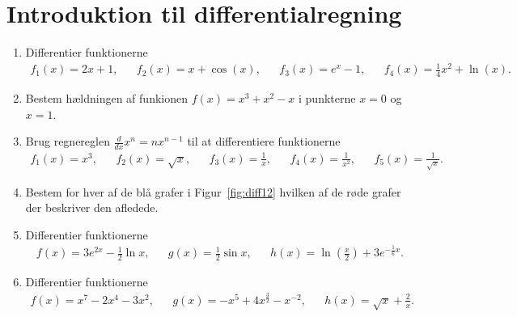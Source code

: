 \section{Introduktion til differentialregning}
\begin{enumerate}
	\item Differentier funktionerne 
	\begin{align*}
	f_1(x)=2x+1,&& f_2(x)=x+\cos(x),&& f_3(x)=e^x-1,&&f_4(x)=\frac{1}{4}x^2+\ln(x).
	\end{align*}
	
	
	\item Bestem hældningen af funkionen $f(x)=x^3+x^2-x$ i punkterne $x=0$ og $x=1$.

	\item Brug regnereglen $\frac{d}{dx} x^n=nx^{n-1}$ til at differentiere funktionerne
	\begin{align*}
	f_1(x)=x^3,&& f_2(x)=\sqrt{x},&& f_3(x)=\frac{1}{x},&&f_4(x)=\frac{1}{x^2},&&f_5(x)=\frac{1}{\sqrt{x}}.
	\end{align*}
	\item \label{it:diff12} Bestem for hver af de blå grafer i Figur~\ref{fig:diff12} hvilken af de røde grafer der beskriver den afledede.
	
	\item Differentier funktionerne 
	\begin{align*}
	f(x)=3e^{2x}-\frac{1}{2}\ln x,&& g(x)=\frac{1}{2}\sin x,&& h(x)=\ln(\frac{x}{2})+3e^{-\frac{1}{6}x}.
	\end{align*}
	
	\item Differentier funktionerne
	\begin{align*}
	f(x)=x^7-2x^4-3x^2,&&g(x)=-x^5+4x^{\frac{3}{2}}-x^{-2},&&h(x)=\sqrt{x}+\frac{2}{x}.
	\end{align*}
	
	\begin{figure}
		\centering
		

\end{figure}
\end{enumerate}
